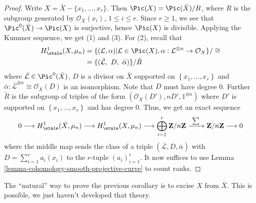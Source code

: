 \begin{proof}
Write $X = \bar X - \{ x_1, \ldots, x_r\}$. Then $\Pic(X) =
\Pic(\bar X)/ R$, where $R$ is the subgroup generated by
$\mathcal{O}_{\bar X}(x_i)$, $1 \leq i \leq r$. Since $r \geq 1$, we see that
$\Pic^0(\bar X) \to \Pic(X)$ is surjective, hence $\Pic(X)$ is
divisible. Applying the Kummer sequence, we get (1) and (3). For (2), recall
that
\begin{align*}
H_\etale^1(X, \mu_n)
& =
\{(\mathcal L, \alpha) |
\mathcal L \in \Pic(X),
\alpha : \mathcal{L}^{\otimes n} \to \mathcal{O}_X\}/\cong \\
& =
\{(\bar{\mathcal L},\ D,\ \bar \alpha)\}/\tilde{R}
\end{align*}
where $\bar{\mathcal L} \in \Pic^0(\bar X)$, $D$ is a divisor on $\bar X$
supported on $\left\{x_1, \ldots, x_r\right\}$ and $ \bar{\alpha}:
\bar{\mathcal L}^{\otimes n} \cong \mathcal{O}_{\bar{X}}(D)$ is an isomorphism.
Note that $D$ must have degree 0. Further $\tilde{R}$ is the subgroup of
triples of the form $(\mathcal{O}_{\bar X}(D'), n D', 1^{\otimes n})$ where
$D'$ is supported on $\left\{x_1, \ldots, x_r\right\}$ and has degree 0. Thus,
we get an exact sequence
$$
0 \longrightarrow
H_\etale^1(\bar X, \mu_n) \longrightarrow
H_\etale^1(X, \mu_n) \longrightarrow
\bigoplus_{i = 1}^r \mathbf{Z}/n\mathbf{Z}
\xrightarrow{\ \sum\ }
\mathbf{Z}/n\mathbf{Z} \longrightarrow 0
$$
where the middle map sends the class of a triple $(\bar{ \mathcal L}, D, \bar
\alpha)$ with $D = \sum_{i = 1}^r a_i (x_i)$ to the $r$-tuple
$(a_i)_{i = 1}^r$. It now suffices to use
Lemma \ref{lemma-cohomology-smooth-projective-curve}
to count ranks.
\end{proof}

\begin{remark}
\label{remark-natural-proof}
The ``natural'' way to prove the previous corollary is to excise $X$ from $\bar
X$. This is possible, we just haven't developed that theory.
\end{remark}

